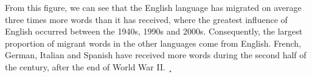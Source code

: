 \documentclass[10pt,letterpaper]{article} %
\begin{document}
% 

From this figure, we can see that the English language has
migrated on average three times more words than it has received, where the
greatest influence of English occurred between the 1940s, 1990s and 2000s.
Consequently, the
largest proportion of migrant words in the other languages come
from English. French, German, Italian and Spanish have received more words
during the second half of the century, after the end of World War II.
¸
\end{document}
